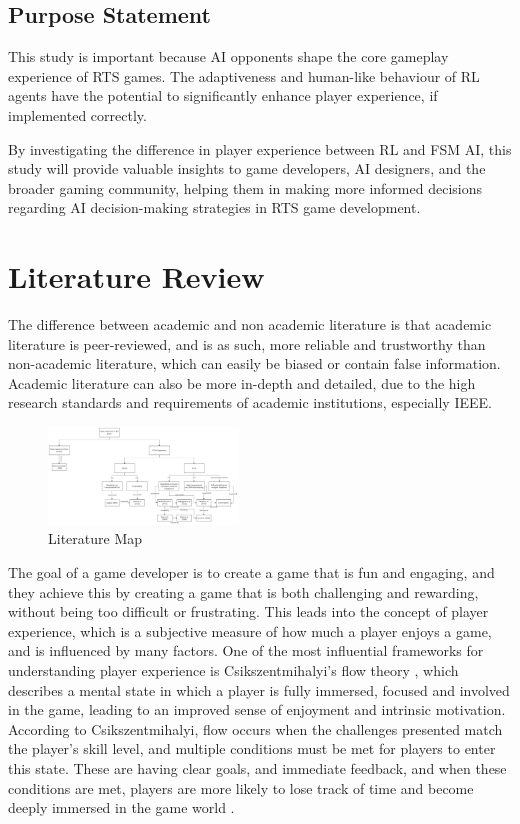\documentclass[conference]{IEEEtran}
\begin{document}
\subsection{Purpose Statement}

This study is important because AI opponents shape the core gameplay experience of RTS games. The adaptiveness and human-like behaviour of RL agents have the potential to
significantly enhance player experience, if implemented correctly.

By investigating the difference in player experience between RL and FSM AI, this study will provide valuable insights to game developers, AI designers, and the broader gaming community, helping them
in making more informed decisions regarding AI decision-making strategies in RTS game development.

\section{Literature Review}

The difference between academic and non academic literature is that academic literature is peer-reviewed, and is as such, more reliable and trustworthy
than non-academic literature, which can easily be biased or contain false information. Academic literature can also be more in-depth and detailed, due to
the high research standards and requirements of academic institutions, especially IEEE.

\begin{figure}[htbp]
	\centering
	\includegraphics[width=0.45\textwidth]{Images/Literature_Map.png}
	\caption{Literature Map}
	\label{fig:literature_map}
\end{figure}

The goal of a game developer is to create a game that is fun and engaging, and they achieve this by creating a game that is both challenging and rewarding, without being too difficult or frustrating.
This leads into the concept of player experience, which is a subjective measure of how much a player enjoys a game, and is influenced by many factors. One of the most influential frameworks for understanding player
experience is Csikszentmihalyi's flow theory \cite{csikszentmihalyi_flow_1990}, which describes a mental state in which a player is fully immersed, focused and involved in the game, leading to an improved sense of
enjoyment and intrinsic motivation. According to Csikszentmihalyi, flow occurs when the challenges presented match the player's skill level, and multiple conditions must be met for players to enter this state.
These are having clear goals, and immediate feedback, and when these conditions are met, players are more likely to lose track of time and become deeply immersed in the game world \cite{csikszentmihalyi_flow_1990}.
\end{document}
